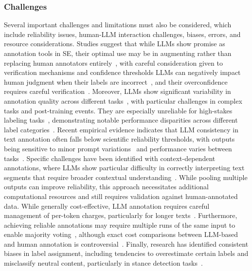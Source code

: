 \subsubsection{Challenges}

Several important challenges and limitations must also be considered, which include reliability issues, human-LLM interaction challenges, biases, errors, and resource considerations.
Studies suggest that while LLMs show promise as annotation tools in SE, their optimal use may be in augmenting rather than replacing human annotators entirely~\cite{DBLP:conf/emnlp/WangLXZZ21, DBLP:conf/chi/HeHDRH24}, with careful consideration given to verification mechanisms and confidence thresholds
LLMs can negatively impact human judgment when their labels are incorrect~\cite{DBLP:conf/www/HuangKA23a}, and their overconfidence requires careful verification~\cite{DBLP:conf/kdd/WanSJKCNSSWYABJ24}.
Moreover, LLMs show significant variability in annotation quality across different tasks~\cite{DBLP:conf/www/HuangKA23a,DBLP:conf/chi/Wang0RMM24}, with particular challenges in complex tasks and post-training events. They are especially unreliable for high-stakes labeling tasks~\cite{DBLP:conf/chi/Wang0RMM24}, demonstrating notable performance disparities across different label categories~\cite{DBLP:journals/corr/abs-2304-10145}. Recent empirical evidence indicates that LLM consistency in text annotation often falls below scientific reliability thresholds, with outputs being sensitive to minor prompt variations~\cite{DBLP:journals/corr/abs-2304-11085} and performance varies between tasks~\cite{DBLP:journals/corr/abs-2306-00176}. Specific challenges have been identified with context-dependent annotations, where LLMs show particular difficulty in correctly interpreting text segments that require broader contextual understanding~\cite{DBLP:conf/chi/HeHDRH24}.
While pooling multiple outputs can improve reliability, this approach necessitates additional computational resources and still requires validation against human-annotated data.
While generally cost-effective, LLM annotation requires careful management of per-token charges, particularly for longer texts~\cite{DBLP:conf/emnlp/WangLXZZ21}. Furthermore, achieving reliable annotations may require multiple runs of the same input to enable majority voting~\cite{DBLP:journals/corr/abs-2304-11085}, although exact cost comparisons between LLM-based and human annotation is controversial~\cite{DBLP:conf/chi/HeHDRH24}.
Finally, research has identified consistent biases in label assignment, including tendencies to overestimate certain labels and misclassify neutral content, particularly in stance detection tasks~\cite{DBLP:journals/corr/abs-2304-10145}. %


